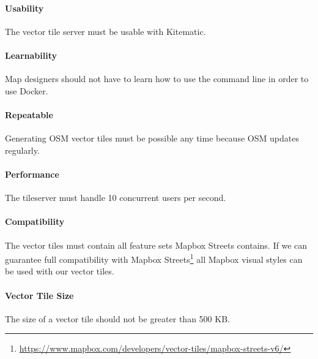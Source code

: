 \paragraph{Usability}
The vector tile server must be usable with Kitematic.

\paragraph{Learnability}

Map designers should not have to learn how to use the command line in
order to use Docker.

\paragraph{Repeatable}

Generating OSM vector tiles must be possible any time because OSM
updates regularly.

\paragraph{Performance}

The tileserver must handle 10 concurrent users per second.

\paragraph{Compatibility}

The vector tiles must contain all feature sets Mapbox Streets contains. If we can guarantee full compatibility with Mapbox Streets\footnote{\url{https://www.mapbox.com/developers/vector-tiles/mapbox-streets-v6/}} all Mapbox visual styles can be used with our vector tiles.

\paragraph{Vector Tile Size}

The size of a vector tile should not be greater than 500 KB.
